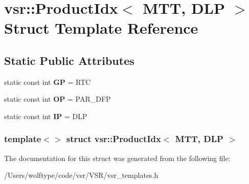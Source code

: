 \hypertarget{structvsr_1_1_product_idx_3_01_m_t_t_00_01_d_l_p_01_4}{\section{vsr\-:\-:Product\-Idx$<$ M\-T\-T, D\-L\-P $>$ Struct Template Reference}
\label{structvsr_1_1_product_idx_3_01_m_t_t_00_01_d_l_p_01_4}
}
\subsection*{Static Public Attributes}
\begin{DoxyCompactItemize}
\item 
\hypertarget{structvsr_1_1_product_idx_3_01_m_t_t_00_01_d_l_p_01_4_a0bae8b0832b91d7cb97f41c21af4f347}{static const int {\bfseries G\-P} = R\-T\-C}\label{structvsr_1_1_product_idx_3_01_m_t_t_00_01_d_l_p_01_4_a0bae8b0832b91d7cb97f41c21af4f347}

\item 
\hypertarget{structvsr_1_1_product_idx_3_01_m_t_t_00_01_d_l_p_01_4_a258cd7001807407a24c69177123fd357}{static const int {\bfseries O\-P} = P\-A\-R\-\_\-\-D\-F\-P}\label{structvsr_1_1_product_idx_3_01_m_t_t_00_01_d_l_p_01_4_a258cd7001807407a24c69177123fd357}

\item 
\hypertarget{structvsr_1_1_product_idx_3_01_m_t_t_00_01_d_l_p_01_4_a3f5be160bbc56d437be8403de79c3279}{static const int {\bfseries I\-P} = D\-L\-P}\label{structvsr_1_1_product_idx_3_01_m_t_t_00_01_d_l_p_01_4_a3f5be160bbc56d437be8403de79c3279}

\end{DoxyCompactItemize}
\subsubsection*{template$<$$>$ struct vsr\-::\-Product\-Idx$<$ M\-T\-T, D\-L\-P $>$}



The documentation for this struct was generated from the following file\-:\begin{DoxyCompactItemize}
\item 
/\-Users/wolftype/code/vsr/\-V\-S\-R/vsr\-\_\-templates.\-h\end{DoxyCompactItemize}

